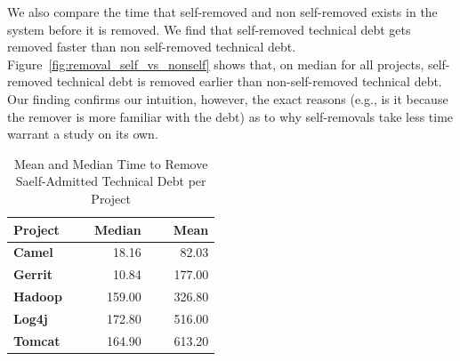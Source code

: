 We also compare the time that self-removed and non self-removed \SATD exists in the system before it is removed. We find that self-removed technical debt gets removed faster than non self-removed technical debt. Figure~\ref{fig:removal_self_vs_nonself} shows that, on median for all projects, self-removed technical debt is removed earlier than non-self-removed technical debt. Our finding confirms our intuition, however, the exact reasons (e.g., is it because the remover is more familiar with the debt) as to why self-removals take less time warrant a study on its own.



\begin{table}[tbh!]
	\centering
	\caption{Mean and Median Time to Remove Saelf-Admitted Technical Debt per Project}
	\label{tab:Distribution_of_the_removed_STD_Comments}
	\begin{tabular}{@{}l|rrrr@{}}
		\toprule
		\textbf{Project} &~&\textbf{Median} &~& \textbf{Mean} \\ \midrule
		\textbf{Camel} &~& 18.16 &~& 82.03 \\
		\textbf{Gerrit} &~& 10.84 &~& 177.00 \\
		\textbf{Hadoop} &~& 159.00 &~& 326.80 \\
		\textbf{Log4j} &~& 172.80 &~& 516.00 \\
		\textbf{Tomcat} &~& 164.90 &~& 613.20 \\			
		
		
		\bottomrule
	\end{tabular}
\end{table}



